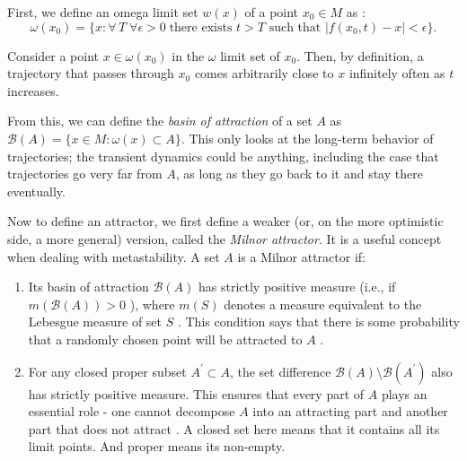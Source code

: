 First, we define an omega limit set $w(x)$ of a point $x_0 \in M$ as \cite{milnor1985on}: 
% 
\begin{equation}
    \omega(x_0) = \{x: \forall\,T \;\forall \epsilon > 0\; \text{there exists } t > T \text{ such that } |f(x_0, t) - x| < \epsilon    \}.
\end{equation}

Consider a point $x \in\omega(x_0)$ in the $\omega$ limit set of $x_0$. Then, by definition, a trajectory that passes through $x_0$ comes arbitrarily close to $x$ infinitely often as $t$ increases. 

From this, we can define the \textit{basin of attraction} of a set $A$ as $\mathcal{B}(A) = \{x \in M: \omega(x) \subset A\}$. This only looks at the long-term behavior of trajectories; the transient dynamics could be anything, including the case that trajectories go very far from $A$, as long as they go back to it and stay there eventually. 


Now to define an attractor, we first define a weaker (or, on the more optimistic side, a more general) version, called the \textit{Milnor attractor}. It is a useful concept when dealing with metastability. A set $A$ is a Milnor attractor if:
\begin{enumerate}
    \item Its basin of attraction $\mathcal{B}(A)$ has strictly positive measure (i.e., if $m(\mathcal{B}(A)) > 0$ ), where $m(S)$ denotes a measure equivalent to the Lebesgue measure of set $S$ \cite{milnor1985on}. This condition says that there is some probability that a randomly chosen point will be attracted to $A$ \cite{milnor1985on}.
    \item For any closed proper subset $A^\prime \subset A$, the set difference $\mathcal{B}(A) \setminus \mathcal{B}(A^\prime)$ also has strictly positive measure. This ensures that every part of $A$ plays an essential role - one cannot decompose $A$ into an attracting part and another part that does not attract \cite{milnor1985on, taylor2011attractors}. A closed set here means that it contains all its limit points. And proper means its non-empty.
\end{enumerate}


